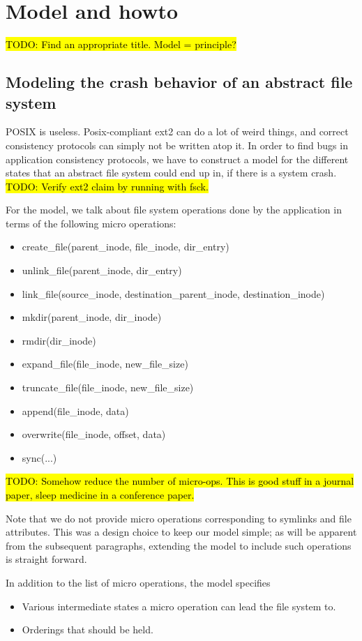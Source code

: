 \section{Model and howto}
\hl{TODO: Find an appropriate title. Model = principle?}
\subsection{Modeling the crash behavior of an abstract file system}
POSIX is useless. Posix-compliant ext2 can do a lot of weird things, and correct consistency protocols can simply not be written atop it. In order to find bugs in application consistency protocols, we have to construct a model for the different states that an abstract file system could end up in, if there is a system crash.
\hl{TODO: Verify ext2 claim by running with fsck.}

For the model, we talk about file system operations done by the application in terms of the following micro operations:
\begin{itemize}
\item create\_file(parent\_inode, file\_inode, dir\_entry)
\item unlink\_file(parent\_inode, dir\_entry)
\item link\_file(source\_inode, destination\_parent\_inode, destination\_inode)
\item mkdir(parent\_inode, dir\_inode)
\item rmdir(dir\_inode)
\item expand\_file(file\_inode, new\_file\_size)
\item truncate\_file(file\_inode, new\_file\_size)
\item append(file\_inode, data)
\item overwrite(file\_inode, offset, data)
\item sync(...)
\end{itemize}
\hl{TODO: Somehow reduce the number of micro-ops. This is good stuff in a journal paper, sleep medicine in a conference paper.}

Note that we do not provide micro operations corresponding to symlinks and file attributes. This was a design choice to keep our model simple; as will be apparent from the subsequent paragraphs, extending the model to include such operations is straight forward.

In addition to the list of micro operations, the model specifies
\begin{itemize}
\item Various intermediate states a micro operation can lead the file system to.
\item Orderings that should be held.
\end{itemize}

